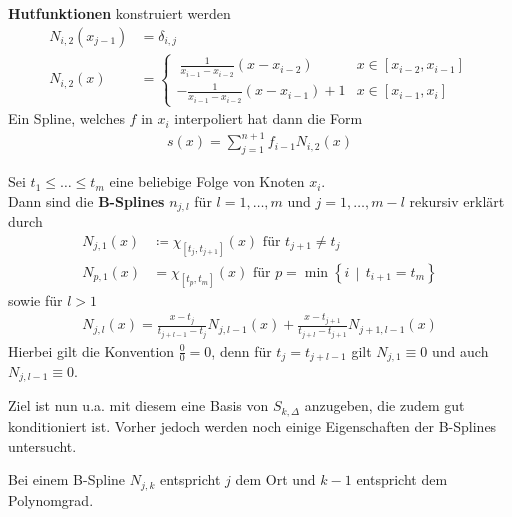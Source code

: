 \begin{Bspe}
\begin{enumerate}[a)]
  \textbf{Hutfunktionen}
  konstruiert werden
  \begin{align*}
    N_{i,2}(x_{j-1}) &= \delta_{i,j}\\
    N_{i,2}(x) &= \begin{cases}
      ~\frac{1}{x_{i-1}-x_{i-2}}(x-x_{i-2}) & x\in [x_{i-2}, x_{i-1}]\\
      -\frac{1}{x_{i-1}-x_{i-2}}(x-x_{i-1})+1 & x\in [x_{i-1}, x_i]
      \end{cases}
  \end{align*}
  \label{im6.2.4(3)}
  Ein Spline, welches $f$ in $x_i$ interpoliert hat dann die Form
  \begin{gather*}
    s(x) = \sum_{j=1}^{n+1}f_{i-1}N_{i,2}(x)
  \end{gather*}
  \end{enumerate}
\end{Bspe}


\begin{Defe}
  Sei $t_1\leq \dots \leq t_m$ eine beliebige Folge von Knoten
  $x_i$.\\
  Dann sind die \textbf{B-Splines}
  $n_{j,l}$ für $l=1,\dots, m$ und $j=1,\dots, m-l$ 
  rekursiv erklärt durch
  \begin{align}\nonumber
    N_{j,1}(x) &\coloneqq \chi_{[t_j,t_{j+1}]}(x) 
                 \text{ für } t_{j+1}\neq t_j\\
    N_{p,1}(x) &= \chi_{[t_p,t_m]}(x) 
                 \text{ für }
                 p=\min\left\{i\,\middle\vert\,t_{i+1}=t_m\right\}
                 \label{VI.2.3}
  \end{align}
  sowie für $l>1$
\begin{gather}
  N_{j,l} (x) = \frac{x-t_j}{t_{j+l-1}-t_j}N_{j,l-1}(x) 
  +  \frac{x-t_{j+1}}{t_{j+l}-t_{j+1}}N_{j+1,l-1}(x) 
\label{VI.2.4}
\end{gather}
Hierbei gilt die Konvention $\frac{0}{0}=0$, 
denn für $t_j=t_{j+l-1}$ gilt
$N_{j,1}\equiv 0$ und auch $N_{j,l-1}\equiv 0$.
\end{Defe}


Ziel ist nun u.a. mit diesem eine Basis von $S_{k,\Delta}$ anzugeben,
die zudem gut konditioniert ist.
Vorher jedoch werden noch einige Eigenschaften der B-Splines
untersucht.


\label{6.2.6}
Bei einem B-Spline $N_{j,k}$ entspricht $j$ dem Ort und
$k-1$ entspricht dem Polynomgrad.

